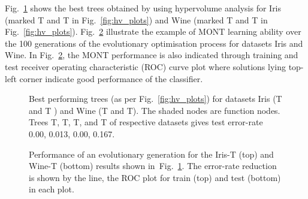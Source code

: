 \documentclass[conference]{IEEEtran}
\begin{document}
Fig.~\ref{fig:nt_best_wine} shows the best trees obtained by using hypervolume analysis for Iris (marked T and T in Fig.~\ref{fig:hv_plots}) and Wine (marked T and T in Fig.~\ref{fig:hv_plots}). Fig.~\ref{fig:nt_best_wine_itr} illustrate the example of MONT learning ability over the 100 generations of the evolutionary optimisation process for datasets Iris and Wine. In Fig.~\ref{fig:nt_best_wine_itr}, the MONT performance is also indicated through training and test receiver operating characteristic (ROC) curve plot where solutions lying top-left corner indicate good performance of the classifier.


\begin{figure}
    \caption{Best performing trees (as per Fig.~\ref{fig:hv_plots}) for datasets Iris (T and T ) and Wine (T and T). The shaded nodes are function nodes. Trees T, T, T, and T of respective datasets gives test error-rate 0.00, 0.013, 0.00, 0.167. } \label{fig:nt_best_wine}
\end{figure}



\begin{figure}
    
    \caption{Performance of an evolutionary generation for the Iris-T (top) and Wine-T (bottom) results shown in~Fig.~\ref{fig:nt_best_wine}. The error-rate reduction is shown by the line, the ROC plot for train (top) and test (bottom) in each plot.}
    \label{fig:nt_best_wine_itr}
\end{figure}
\end{document}
